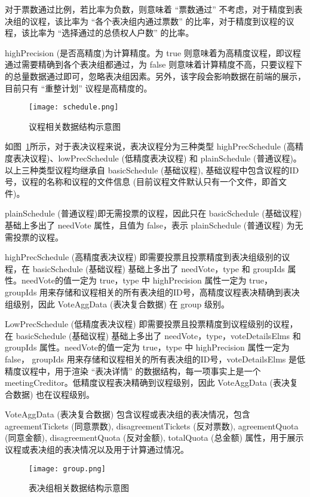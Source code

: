   对于票数通过比例，若比率为负数，则意味着 “票数通过” 不考虑，对于精度到表决组的议程，该比率为 “各个表决组内通过票数” 的比率，对于精度到议程的议程，该比率为 “选择通过的总债权人户数” 的比率。

  highPrecision (是否高精度)为计算精度。为 true 则意味着为高精度议程，即议程通过需要精确到各个表决组都通过，为 false 则意味着计算精度不高，只要议程下的总量数据通过即可，忽略表决组因素。另外，该字段会影响数据在前端的展示，目前只有 “重整计划” 议程是高精度的。

    \begin{figure}[!htp]
      \centering
      \texttt{[image: schedule.png]}
      \caption{议程相关数据结构示意图}
      \label{fig:schedule}
    \end{figure}

    如图~\ref{fig:schedule}所示，对于表决议程来说，表决议程分为三种类型 highPrecSchedule (高精度表决议程)、lowPrecSchedule (低精度表决议程) 和 plainSchedule (普通议程)。以上三种类型议程均继承自 basicSchedule (基础议程), 基础议程中包含议程的ID号，议程的名称和议程的文件信息 (目前议程文件默认只有一个文件，即首文件)。

  plainSchedule (普通议程)即无需投票的议程，因此只在 basicSchedule (基础议程) 基础上多出了 needVote 属性，且值为 false，表示 plainSchedule (普通议程) 为无需投票的议程。

  highPrecSchedule (高精度表决议程) 即需要投票且投票精度到表决组级别的议程，在 basicSchedule (基础议程) 基础上多出了 needVote，type 和 groupIds 属性。needVote的值一定为 true，type 中 highPrecision 属性一定为 true， groupIds 用来存储和议程相关的所有表决组的ID号，高精度议程表决精确到表决组级别，因此 VoteAggData (表决复合数据) 在 group 级别。

  LowPrecSchedule (低精度表决议程) 即需要投票且投票精度到议程级别的议程，在 basicSchedule (基础议程) 基础上多出了 needVote，type，voteDetailsElms 和 groupIds 属性。needVote的值一定为 true，type 中 highPrecision 属性一定为 false， groupIds 用来存储和议程相关的所有表决组的ID号，voteDetailsElms 是低精度议程中，用于渲染 “表决详情” 的数据结构，每一项事实上是一个 meetingCreditor。低精度议程表决精确到议程级别，因此 VoteAggData (表决复合数据) 也在议程级别。

  VoteAggData (表决复合数据) 包含议程或表决组的表决情况，包含 agreementTickets (同意票数), disagreementTickets (反对票数), agreementQuota (同意金额), disagreementQuota (反对金额), totalQuota (总金额) 属性，用于展示议程或表决组的表决情况以及用于计算通过情况。

  \begin{figure}[!htp]
    \centering
    \texttt{[image: group.png]}
    \caption{表决组相关数据结构示意图}
   \label{fig:group}
  \end{figure}

